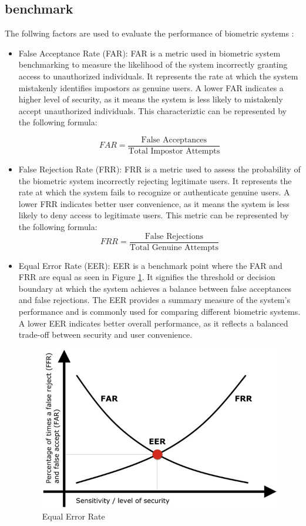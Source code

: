 \subsection{benchmark}

The follwing factors are used to evaluate the performance of biometric systems \cite{benchmarks}:

\begin{itemize}
	\item False Acceptance Rate (FAR):
	FAR is a metric used in biometric system benchmarking to measure the likelihood of the system incorrectly granting access to unauthorized individuals. It represents the rate at which the system mistakenly identifies impostors as genuine users. A lower FAR indicates a higher level of security, as it means the system is less likely to mistakenly accept unauthorized individuals. This characteriztic can be represented by the following formula:

	\begin{equation}
		FAR = \frac{\text{False Acceptances}}{\text{Total Impostor Attempts}}
	\end{equation}
	
	\item False Rejection Rate (FRR):
	FRR is a metric used to assess the probability of the biometric system incorrectly rejecting legitimate users. It represents the rate at which the system fails to recognize or authenticate genuine users. A lower FRR indicates better user convenience, as it means the system is less likely to deny access to legitimate users. This metric can be represented by the following formula:
	\begin{equation}
		FRR = \frac{\text{False Rejections}}{\text{Total Genuine Attempts}}
	\end{equation}
	
	\item Equal Error Rate (EER):
	EER is a benchmark point where the FAR and FRR are equal as seen in Figure \ref{fig:eer}. It signifies the threshold or decision boundary at which the system achieves a balance between false acceptances and false rejections. The EER provides a summary measure of the system's performance and is commonly used for comparing different biometric systems. A lower EER indicates better overall performance, as it reflects a balanced trade-off between security and user convenience.
	\begin{figure}[h]
	    \centering
	    \includegraphics[width=0.7\linewidth]{images/eer}
	    \caption{Equal Error Rate \cite{eer}}
	    \label{fig:eer}
	\end{figure}
\end{itemize}